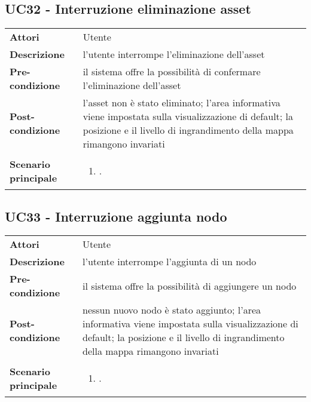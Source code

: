 \subsection{UC32 - Interruzione eliminazione asset} 
\label{sssec:UC32} 
\def\arraystretch{1.5}
\begin{tabularx}{\textwidth}{l|p{}}
	\rowcolor{I} \multicolumn{2}{c}{\color{white}\textbf{UC32 - Interruzione eliminazione asset}} \\
	\toprule
	\endhead
	\textbf{Attori} & Utente\\
	\textbf{Descrizione} & l'utente interrompe l'eliminazione dell'asset\\
	\textbf{Pre-condizione} & il sistema offre la possibilità di confermare l'eliminazione dell'asset\\
	\textbf{Post-condizione} & l'asset non è stato eliminato; l'area informativa viene impostata sulla visualizzazione di default; la posizione e il livello di ingrandimento della mappa rimangono invariati\\
	\textbf{Scenario principale} & \vspace{-1.2em}\begin{enumerate}[leftmargin=*,noitemsep,nosep]
		\item \nameref{sssec:UC32}.
	\end{enumerate}\\
	\bottomrule
\end{tabularx}
\subsection{UC33 - Interruzione aggiunta nodo} 
\label{sssec:UC33} 
\def\arraystretch{1.5}
\begin{tabularx}{\textwidth}{l|p{}}
	\rowcolor{I} \multicolumn{2}{c}{\color{white}\textbf{UC33 - Interruzione aggiunta nodo}} \\
	\toprule
	\endhead
	\textbf{Attori} & Utente\\
	\textbf{Descrizione} & l'utente interrompe l'aggiunta di un nodo\\
	\textbf{Pre-condizione} & il sistema offre la possibilità di aggiungere un nodo\\
	\textbf{Post-condizione} & nessun nuovo nodo è stato aggiunto;  l'area informativa viene impostata sulla visualizzazione di default; la posizione e il livello di ingrandimento della mappa rimangono invariati\\
	\textbf{Scenario principale} & \vspace{-1.2em}\begin{enumerate}[leftmargin=*,noitemsep,nosep]
		\item \nameref{sssec:UC33}.
	\end{enumerate}\\
	\bottomrule
\end{tabularx}
